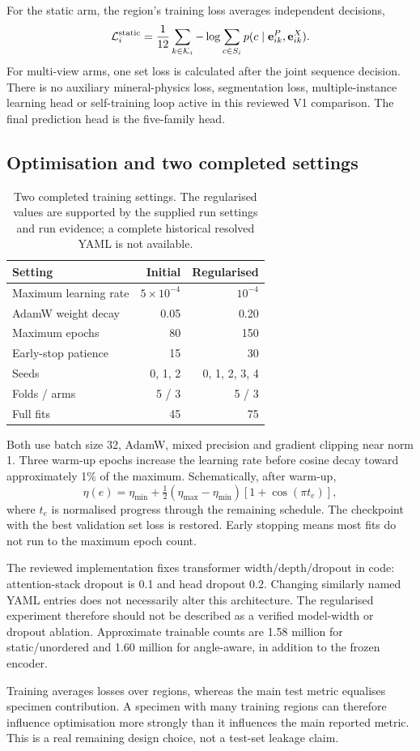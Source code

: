 For the static arm, the region's training loss averages independent decisions,
\begin{equation}
\mathcal L_i^{\rm static}=\frac1{12}\sum_{k\in\mathcal K_i}
-\log\sum_{c\in S_i}p(c\mid\mathbf e_{ik}^P,\mathbf e_{ik}^X).
\end{equation}
For multi-view arms, one set loss is calculated after the joint sequence decision. There is no auxiliary mineral-physics loss, segmentation loss, multiple-instance learning head or self-training loop active in this reviewed V1 comparison. The final prediction head is the five-family head.

\subsection{Optimisation and two completed settings}
\begin{table}[htbp]\centering
\begin{tabular}{@{}lrr@{}}\toprule Setting & Initial & Regularised\\\midrule
Maximum learning rate & $5\times10^{-4}$ & $10^{-4}$\\
AdamW weight decay & 0.05 & 0.20\\
Maximum epochs & 80 & 150\\
Early-stop patience & 15 & 30\\
Seeds & 0, 1, 2 & 0, 1, 2, 3, 4\\
Folds / arms & 5 / 3 & 5 / 3\\
Full fits & 45 & 75\\\bottomrule
\end{tabular}
\caption{Two completed training settings. The regularised values are supported by the supplied run settings and run evidence; a complete historical resolved YAML is not available.}
\end{table}
Both use batch size 32, AdamW, mixed precision and gradient clipping near norm 1. Three warm-up epochs increase the learning rate before cosine decay toward approximately 1\% of the maximum. Schematically, after warm-up,
\begin{equation}
\eta(e)=\eta_{\min}+\tfrac12(\eta_{\max}-\eta_{\min})[1+\cos(\pi t_e)],
\end{equation}
where $t_e$ is normalised progress through the remaining schedule. The checkpoint with the best validation set loss is restored. Early stopping means most fits do not run to the maximum epoch count.

The reviewed implementation fixes transformer width/depth/dropout in code: attention-stack dropout is 0.1 and head dropout 0.2. Changing similarly named YAML entries does not necessarily alter this architecture. The regularised experiment therefore should not be described as a verified model-width or dropout ablation. Approximate trainable counts are 1.58 million for static/unordered and 1.60 million for angle-aware, in addition to the frozen encoder.

Training averages losses over regions, whereas the main test metric equalises specimen contribution. A specimen with many training regions can therefore influence optimisation more strongly than it influences the main reported metric. This is a real remaining design choice, not a test-set leakage claim.
\FloatBarrier

